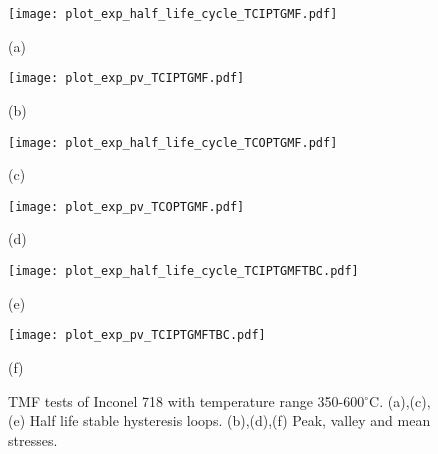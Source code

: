 \begin{figure}
  \begin{minipage}[t]{0.5\linewidth} %
  \nonumber
    \centering
    \texttt{[image: plot\_exp\_half\_life\_cycle\_TCIPTGMF.pdf]}
    \centerline{(a)}
  \end{minipage}%
  \begin{minipage}[t]{0.5\linewidth}
    \centering
    \texttt{[image: plot\_exp\_pv\_TCIPTGMF.pdf]}
    \centerline{(b)}
  \end{minipage}

  \begin{minipage}[t]{0.5\linewidth} %
  \nonumber
    \centering
    \texttt{[image: plot\_exp\_half\_life\_cycle\_TCOPTGMF.pdf]}
    \centerline{(c)}
  \end{minipage}%
  \begin{minipage}[t]{0.5\linewidth}
    \centering
    \texttt{[image: plot\_exp\_pv\_TCOPTGMF.pdf]}
    \centerline{(d)}
  \end{minipage}

  \begin{minipage}[t]{0.5\linewidth} %
  \nonumber
    \centering
    \texttt{[image: plot\_exp\_half\_life\_cycle\_TCIPTGMFTBC.pdf]}
    \centerline{(e)}
  \end{minipage}%
  \begin{minipage}[t]{0.5\linewidth}
    \centering
    \texttt{[image: plot\_exp\_pv\_TCIPTGMFTBC.pdf]}
    \centerline{(f)}
  \end{minipage}

  \caption{TMF tests of Inconel 718 with temperature range 350-600$^{\circ}$C.
  (a),(c),(e) Half life stable hysteresis loops.
  (b),(d),(f) Peak, valley and mean stresses.}
  \label{Fig:plot_exp_TCTMF}
\end{figure}



